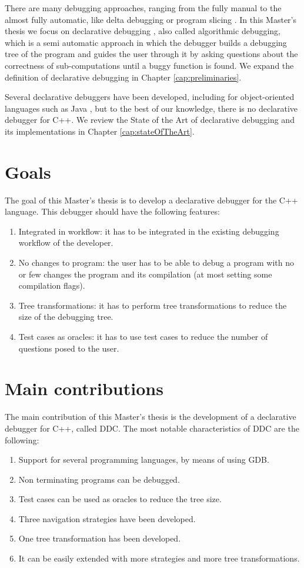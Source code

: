 There are many debugging approaches, ranging from the fully manual to the almost fully automatic, like delta debugging or program slicing \cite{WhyProgramsFail}. In this Master's thesis we focus on declarative debugging \cite{shapiro1982algorithmic}, also called algorithmic debugging, which is a semi automatic approach in which the debugger builds a debugging tree of the program and guides the user through it by asking questions about the correctness of sub-computations until a buggy function is found. We expand the definition of declarative debugging in Chapter \ref{cap:preliminaries}.

Several declarative debuggers have been developed, including for object-oriented languages such as Java \cite{DDJ}, but to the best of our knowledge, there is no declarative debugger for C++. We review the State of the Art of declarative debugging and its implementations in Chapter \ref{cap:stateOfTheArt}.

\section{Goals}
The goal of this Master's thesis is to develop a declarative debugger for the C++ language.
This debugger should have the following features:
\begin{enumerate}
  \item Integrated in workflow: it has to be integrated in the existing debugging workflow of the developer. \label{goal1}
  \item No changes to program: the user has to be able to debug a program with no or few changes the program and its compilation (at most setting some compilation flags). \label{goal2}
  \item Tree transformations: it has to perform tree transformations to reduce the size of the debugging tree. \label{goal3}
  \item Test cases as oracles: it has to use test cases to reduce the number of questions posed to the user. \label{goal4}
\end{enumerate}

\section{Main contributions}

The main contribution of this Master's thesis is the development of a declarative debugger for C++, called DDC.
%
The most notable characteristics of DDC are the following:
\begin{enumerate}
\item Support for several programming languages, by means of using GDB.
\item Non terminating programs can be debugged.
\item Test cases can be used as oracles to reduce the tree size.
\item Three navigation strategies have been developed.
\item One tree transformation has been developed.
\item It can be easily extended with more strategies and more tree transformations.
\end{enumerate}

